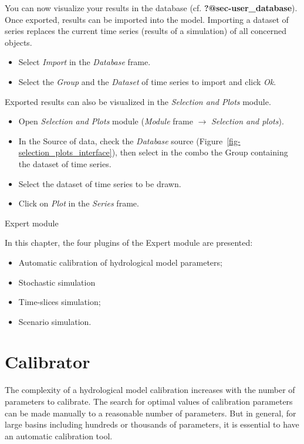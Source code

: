 \documentclass[
  letterpaper,
  DIV=11,
  numbers=noendperiod]{scrreprt}
\begin{document}
You can now visualize your results in the database (cf.
\textbf{?@sec-user\_database}). Once exported, results can be imported
into the model. Importing a dataset of series replaces the current time
series (results of a simulation) of all concerned objects.

\begin{itemize}
\item
  {Select \emph{Import} in the \emph{Database} frame.}
\item
  {Select the \emph{Group} and the \emph{Dataset} of time series to
  import and click \emph{Ok}.}
\end{itemize}

Exported results can also be visualized in the \emph{Selection and
Plots} module.

\begin{itemize}
\item
  {Open \emph{Selection and Plots} module (\emph{Module} frame
  \(\rightarrow\) \emph{Selection and plots}).}
\item
  {In the Source of data, check the \emph{Database} source
  (Figure~\ref{fig-selection_plots_interface}), then select in the combo
  the Group containing the dataset of time series.}
\item
  {Select the dataset of time series to be drawn.}
\item
  {Click on \emph{Plot} in the \emph{Series} frame.}
\end{itemize}

Expert module

In this chapter, the four plugins of the Expert module are presented:

\begin{itemize}
\item
  Automatic calibration of hydrological model parameters;
\item
  Stochastic simulation
\item
  Time-slices simulation;
\item
  Scenario simulation.
\end{itemize}

\hypertarget{sec-user_expert_module_calibrator}{%
\chapter{Calibrator}\label{sec-user_expert_module_calibrator}}

The complexity of a hydrological model calibration increases with the
number of parameters to calibrate. The search for optimal values of
calibration parameters can be made manually to a reasonable number of
parameters. But in general, for large basins including hundreds or
thousands of parameters, it is essential to have an automatic
calibration tool.
\end{document}
